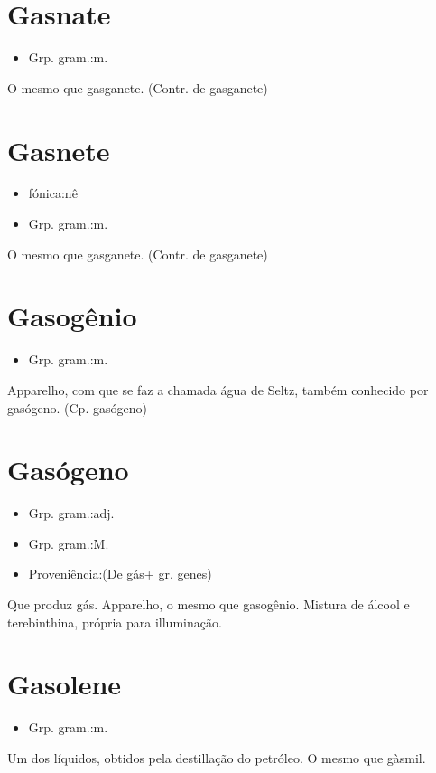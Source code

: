 \section{Gasnate}
\begin{itemize}
\item {Grp. gram.:m.}
\end{itemize}
O mesmo que \textunderscore gasganete\textunderscore .
(Contr. de \textunderscore gasganete\textunderscore )
\section{Gasnete}
\begin{itemize}
\item {fónica:nê}
\end{itemize}
\begin{itemize}
\item {Grp. gram.:m.}
\end{itemize}
O mesmo que \textunderscore gasganete\textunderscore .
(Contr. de \textunderscore gasganete\textunderscore )
\section{Gasogênio}
\begin{itemize}
\item {Grp. gram.:m.}
\end{itemize}
Apparelho, com que se faz a chamada água de Seltz, também conhecido por gasógeno.
(Cp. \textunderscore gasógeno\textunderscore )
\section{Gasógeno}
\begin{itemize}
\item {Grp. gram.:adj.}
\end{itemize}
\begin{itemize}
\item {Grp. gram.:M.}
\end{itemize}
\begin{itemize}
\item {Proveniência:(De \textunderscore gás\textunderscore  + gr. \textunderscore genes\textunderscore )}
\end{itemize}
Que produz gás.
Apparelho, o mesmo que \textunderscore gasogênio\textunderscore .
Mistura de álcool e terebinthina, própria para illuminação.
\section{Gasolene}
\begin{itemize}
\item {Grp. gram.:m.}
\end{itemize}
Um dos líquidos, obtidos pela destillação do petróleo.
O mesmo que \textunderscore gàsmil\textunderscore .
